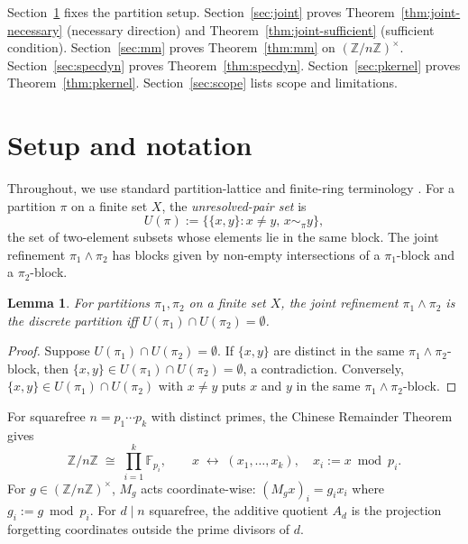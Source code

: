 \documentclass[11pt,reqno]{amsart}
\theoremstyle{plain}
\newtheorem{lemma}[theorem]{Lemma}
\theoremstyle{definition}
\theoremstyle{remark}
\newcommand{\Z}{\mathbb{Z}}
\newcommand{\F}{\mathbb{F}}
\begin{document}
Section~\ref{sec:setup} fixes the partition setup. Section~\ref{sec:joint}
proves Theorem~\ref{thm:joint-necessary} (necessary direction) and
Theorem~\ref{thm:joint-sufficient} (sufficient condition).
Section~\ref{sec:mm} proves Theorem~\ref{thm:mm} on
$(\Z/n\Z)^{\times}$. Section~\ref{sec:specdyn} proves
Theorem~\ref{thm:specdyn}. Section~\ref{sec:pkernel} proves
Theorem~\ref{thm:pkernel}. Section~\ref{sec:scope} lists scope and
limitations.

\section{Setup and notation}\label{sec:setup}

Throughout, we use standard partition-lattice and finite-ring
terminology \cite{Birkhoff1940,Stanley1999,Lang2002,DummitFoote2004}.
For a partition $\pi$ on a finite set $X$, the \emph{unresolved-pair
set} is
\[
  U(\pi) := \big\{\{x, y\} : x \ne y, \, x \sim_{\pi} y\big\},
\]
the set of two-element subsets whose elements lie in the same block.
The joint refinement $\pi_{1} \wedge \pi_{2}$ has blocks given by
non-empty intersections of a $\pi_{1}$-block and a $\pi_{2}$-block.

\begin{lemma}\label{lem:joint-disjoint}
For partitions $\pi_{1}, \pi_{2}$ on a finite set $X$, the joint
refinement $\pi_{1} \wedge \pi_{2}$ is the discrete partition iff
$U(\pi_{1}) \cap U(\pi_{2}) = \emptyset$.
\end{lemma}

\begin{proof}
Suppose $U(\pi_{1}) \cap U(\pi_{2}) = \emptyset$. If $\{x, y\}$ are
distinct in the same $\pi_{1} \wedge \pi_{2}$-block, then $\{x, y\}
\in U(\pi_{1}) \cap U(\pi_{2}) = \emptyset$, a contradiction.
Conversely, $\{x, y\} \in U(\pi_{1}) \cap U(\pi_{2})$ with $x \ne y$
puts $x$ and $y$ in the same $\pi_{1} \wedge \pi_{2}$-block.
\end{proof}

For squarefree $n = p_{1} \cdots p_{k}$ with distinct primes, the
Chinese Remainder Theorem \cite[\S I.5]{Lang2002} gives
\[
  \Z/n\Z \;\cong\; \prod_{i=1}^{k} \F_{p_{i}}, \qquad x \;\longleftrightarrow\;
  (x_{1}, \ldots, x_{k}), \quad x_{i} := x \bmod p_{i}.
\]
For $g \in (\Z/n\Z)^{\times}$, $M_{g}$ acts coordinate-wise:
$(M_{g} x)_{i} = g_{i} x_{i}$ where $g_{i} := g \bmod p_{i}$. For
$d \mid n$ squarefree, the additive quotient $A_{d}$ is the projection
forgetting coordinates outside the prime divisors of $d$.
\end{document}
